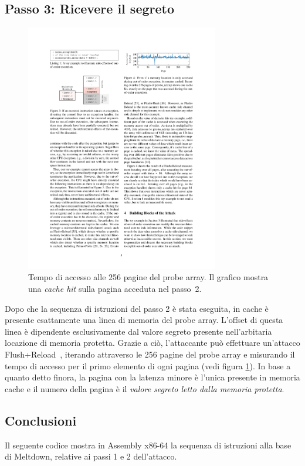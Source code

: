 \subsection{Passo 3: Ricevere il segreto}
\label{sec:meltdown-passo-3}

\begin{figure}
	\centering
	\includegraphics[width=0.75\textwidth]{"img/probe-array.pdf"}
	\caption{Tempo di accesso alle 256 pagine del probe array. Il grafico mostra una \emph{cache hit} sulla pagina acceduta nel passo~2.~\cite{lipp:meltdown}}
	\label{fig:probe-array}
\end{figure}

Dopo che la sequenza di istruzioni del passo 2 è stata eseguita, in cache è presente esattamente una linea di memoria del probe array.
L'offset di questa linea è dipendente esclusivamente dal valore segreto presente nell'arbitaria locazione di memoria protetta.
Grazie a ciò, l'attaccante può effettuare un'attacco Flush+Reload~\cite{yaron:flush-reload}, iterando attraverso le 256 pagine del probe array e misurando il tempo di accesso per il primo elemento di ogni pagina (vedi figura \ref{fig:probe-array}).
In base a quanto detto finora, la pagina con la latenza minore è l'unica presente in memoria cache e il numero della pagina è il \emph{valore segreto letto dalla memoria protetta}.


\subsection{Conclusioni}
\label{sec:meltdown-conclusioni}
Il seguente codice mostra in Assembly x86-64 la sequenza di istruzioni alla base di Meltdown, relative ai passi 1 e 2 dell'attacco.

